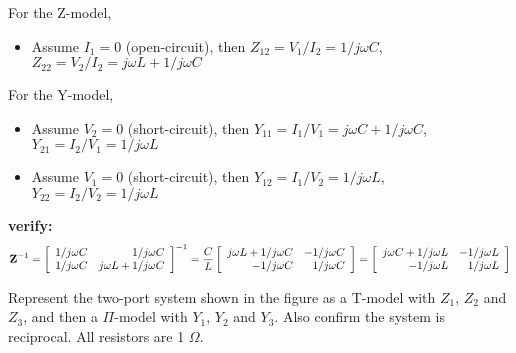  For the Z-model, 
 \begin{itemize}
 item Assume $I_2=0$ (open-circuit), then
 	$Z_{11}=V_1/I_1=1/j\omega C$, $Z_{21}=V_2/I_1=1/j\omega C$
 \item Assume $I_1=0$ (open-circuit), then
 	$Z_{12}=V_1/I_2=1/j\omega C$, $Z_{22}=V_2/I_2=j\omega L+1/j\omega C$
 \end{itemize}
 For the Y-model, 
 \begin{itemize}
 \item Assume $V_2=0$ (short-circuit), then
 	$Y_{11}=I_1/V_1=j\omega C+1/j\omega C$, $Y_{21}=I_2/V_1=1/j\omega L$
 \item Assume $V_1=0$ (short-circuit), then
 	$Y_{12}=I_1/V_2=1/j\omega L$, $Y_{22}=I_2/V_2=1/j\omega L$
 \end{itemize}
 {\bf verify:}
 \[ {\bf Z}^{-1}=\left[ \begin{array}{rr} 1/j\omega C & 1/j\omega C \\
 	1/j\omega C & j\omega L+1/j\omega C \end{array} \right]^{-1}
 	=\frac{C}{L}\left[ \begin{array}{rr} j\omega L+1/j\omega C & -1/j\omega C \\
 	-1/j\omega C & 1/j\omega C \end{array} \right]
 	=\left[ \begin{array}{rr} j\omega C+1/j\omega L & -1/j\omega L \\
 	-1/j\omega L & 1/j\omega L \end{array} \right]
 \]

\item Represent the two-port system shown in the figure as a T-model with
$Z_1$, $Z_2$ and $Z_3$, and then a $\Pi$-model with $Y_1$, $Y_2$ and 
$Y_3$. Also confirm the system is reciprocal. All resistors are 1 $\Omega$.


